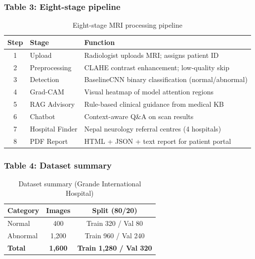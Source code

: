 \documentclass[11pt,a4paper]{article}
\begin{document}
\subsubsection{Table 3: Eight-stage pipeline}
\begin{table}[H]
\centering
\caption{Eight-stage MRI processing pipeline}
\label{tab:pipeline}
\small
\begin{tabular}{|c|l|p{9.2cm}|}
\hline
\textbf{Step} & \textbf{Stage} & \textbf{Function} \\
\hline
1 & Upload           & Radiologist uploads MRI; assigns patient ID \\
\hline
2 & Preprocessing    & CLAHE contrast enhancement; low-quality skip \\
\hline
3 & Detection        & BaselineCNN binary classification (normal/abnormal) \\
\hline
4 & Grad-CAM         & Visual heatmap of model attention regions \\
\hline
5 & RAG Advisory     & Rule-based clinical guidance from medical KB \\
\hline
6 & Chatbot          & Context-aware Q\&A on scan results \\
\hline
7 & Hospital Finder  & Nepal neurology referral centres (4 hospitals) \\
\hline
8 & PDF Report       & HTML + JSON + text report for patient portal \\
\hline
\end{tabular}
\end{table}

\subsubsection{Table 4: Dataset summary}
\begin{table}[H]
\centering
\caption{Dataset summary (Grande International Hospital)}
\label{tab:dataset}
\small
\begin{tabular}{|l|c|c|}
\hline
\textbf{Category} & \textbf{Images} & \textbf{Split (80/20)} \\
\hline
Normal   & 400   & Train 320 / Val 80 \\
\hline
Abnormal & 1{,}200 & Train 960 / Val 240 \\
\hline
\textbf{Total} & \textbf{1{,}600} & \textbf{Train 1{,}280 / Val 320} \\
\hline
\end{tabular}
\end{table}
\end{document}

